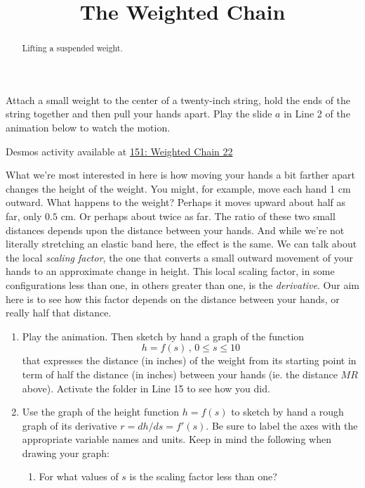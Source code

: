 \documentclass{ximera}
\title{The Weighted Chain}
\begin{document}
\begin{abstract}
Lifting a suspended weight.
\end{abstract}
\maketitle


\begin{question}  \label{Q:LMMN89}
Attach a small weight to the center of a twenty-inch string, hold the ends of the string together and then pull your hands apart. Play the slide $a$ in Line 2 of the animation below to watch the motion. 
\begin{onlineOnly}
    \begin{center}
\end{center}
\end{onlineOnly}

Desmos activity available at \href{https://www.desmos.com/calculator/jmqscra2if}{151: Weighted Chain 22} 

What we're most interested in here is how moving your hands a bit farther apart changes the height of the weight. You might, for example, move each hand 1 cm outward. What happens to the weight? Perhaps it moves upward about half as far, only $0.5$ cm. Or perhaps about twice as far. The ratio of these two small distances depends upon the distance between your hands. And while we're not literally stretching an elastic band here, the effect is the same. We can talk about the local \emph{scaling factor}, the one that converts a small outward movement of your hands to an approximate change in height. This local scaling factor, in some configurations less than one, in others greater than one, is the \emph{derivative}. Our aim here is to see how this factor depends on the distance between your hands, or really half that distance.


\begin{enumerate}
\item Play the animation. Then sketch by hand a graph of the function
\[
 h = f(s) \, , \, 0\leq s \leq 10
\]
that expresses the distance (in inches) of the weight from its starting point in term of half the distance (in inches) between your hands (ie. the distance $MR$ above). Activate the folder in Line 15 to see how you did.

\item Use the graph of the height function $h=f(s)$ to sketch by hand a rough graph of its derivative $r = dh/ds = f'(s)$. Be sure to label the axes with the appropriate variable names and units. Keep in mind the following when drawing your graph:
\begin{enumerate}
\item For what values of $s$ is the scaling factor less than one?


\end{enumerate}
\end{enumerate}
\end{question}
\end{document}

